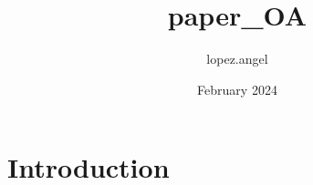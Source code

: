 \documentclass{article}
\title{paper_OA}
\author{lopez.angel }
\date{February 2024}
\begin{document}
\maketitle

\section{Introduction}
\end{document}
